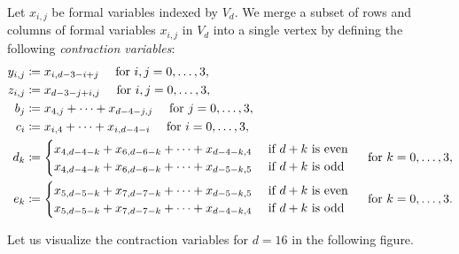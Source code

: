 \begin{definition}\label{def:contraction-variables}
Let \( x_{i,j} \) be formal variables indexed by \( V_d \). We merge a subset of rows and columns of formal variables \( x_{i,j} \) in \( V_d \) into a single vertex by defining the following \emph{contraction variables}:
\begin{align*}
    y_{i,j} &\coloneqq x_{i, d-3-i+j} \quad \text{ for } i,j = 0, \dots, 3, \\
    z_{i,j} &\coloneqq x_{d-3-j+i,j} \quad \text{ for } i,j = 0, \dots, 3, \\
    b_j &\coloneqq x_{4,j} + \dots + x_{d-4-j,j} \quad \text{ for } j = 0, \dots, 3, \\
    c_i &\coloneqq x_{i,4} + \dots + x_{i,d-4-i} \quad \text{ for } i = 0, \dots, 3, \\
    d_k &\coloneqq \begin{cases}
        x_{4,d-4-k} + x_{6,d-6-k} + \dots + x_{d-4-k,4} & \text{ if \( d + k \) is even} \\
        x_{4,d-4-k} + x_{6,d-6-k} + \dots + x_{d-5-k,5} & \text{ if \( d + k \) is odd}
    \end{cases} \quad \text{ for } k = 0, \dots, 3, \\
    e_k &\coloneqq \begin{cases}
        x_{5,d-5-k} + x_{7,d-7-k} + \dots + x_{d-5-k,5} & \text{ if \( d + k \) is even} \\
        x_{5,d-5-k} + x_{7,d-7-k} + \dots + x_{d-4-k,4} & \text{ if \( d + k \) is odd}
    \end{cases} \quad \text{ for } k = 0, \dots, 3.
\end{align*}
\end{definition}

Let us visualize the contraction variables for \( d = 16 \) in the following figure.

